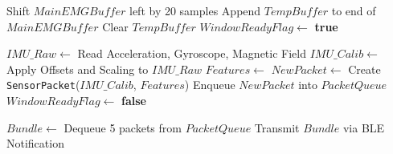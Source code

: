 \begin{algorithm}
\begin{algorithmic}[1]
            \State Shift $MainEMGBuffer$ left by 20 samples
            \State Append $TempBuffer$ to end of $MainEMGBuffer$
            \State Clear $TempBuffer$
            \State $WindowReadyFlag \gets$ \textbf{true}
        \EndIf
    \EndIf

        \State $IMU\_Raw \gets$ Read Acceleration, Gyroscope, Magnetic Field
        \State $IMU\_Calib \gets$ Apply Offsets and Scaling to $IMU\_Raw$
        \State $Features \gets$ 
        \State $NewPacket \gets$ Create \texttt{SensorPacket}($IMU\_Calib$, $Features$)
        \State Enqueue $NewPacket$ into $PacketQueue$
        \State $WindowReadyFlag \gets$ \textbf{false}
    \EndIf

        \State $Bundle \gets$ Dequeue 5 packets from $PacketQueue$
        \State Transmit $Bundle$ via BLE Notification
    \EndWhile
\EndProcedure
\end{algorithmic}
\end{algorithm}


